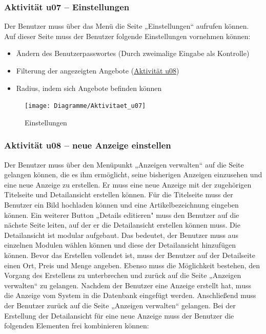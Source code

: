 \documentclass[a4paper,12pt,oneside]{scrartcl}
\begin{document}
\subsubsection{Aktivität u07 – Einstellungen}
Der Benutzer muss über das Menü die Seite „Einstellungen“ aufrufen können.
Auf dieser Seite muss der Benutzer folgende Einstellungen vornehmen können:
\begin{itemize}
	\item Ändern des Benutzerpasswortes (Durch zweimalige Eingabe als Kontrolle)
	\item Filterung der angezeigten Angebote (\hyperlink{u08}{Aktivität u08})
	\item Radius, indem sich Angebote befinden können
\end{itemize}

\begin{figure}[!htbp]
\centering
\noindent\texttt{[image: Diagramme/Aktivitaet\_u07]}
\caption{Einstellungen}
\end{figure}
\FloatBarrier


\hypertarget{u08}{\subsubsection{Aktivität u08 – neue Anzeige einstellen}}
Der Benutzer muss über den Menüpunkt „Anzeigen verwalten“ auf die Seite gelangen können, die es ihm ermöglicht, seine bisherigen Anzeigen einzusehen und eine neue Anzeige zu erstellen. 
Er muss eine neue Anzeige mit der zugehörigen Titelseite und Detailansicht erstellen können.
Für die Titelseite muss der Benutzer ein Bild hochladen können und eine Artikelbezeichnung eingeben können. 
Ein weiterer Button „Details editieren" muss den Benutzer auf die nächste Seite leiten, auf der er die Detailansicht erstellen können muss. 
Die Detailansicht ist modular aufgebaut. Das bedeutet, der Benutzer muss aus einzelnen Modulen wählen können und diese der Detailansicht hinzufügen können.
Bevor das Erstellen vollendet ist, muss der Benutzer auf der Detailseite einen Ort, Preis und Menge angeben.
Ebenso muss die Möglichkeit bestehen, den Vorgang des Erstellens zu unterbrechen und zurück auf die Seite „Anzeigen verwalten“ zu gelangen.
Nachdem der Benutzer eine Anzeige erstellt hat, muss die Anzeige vom System in die Datenbank eingefügt werden.
Anschließend muss der Benutzer zurück auf die Seite „Anzeigen verwalten“ gelangen. 
Bei der Erstellung der Detailansicht für eine neue Anzeige muss der Benutzer die folgenden Elementen frei kombinieren können:
\end{document}
